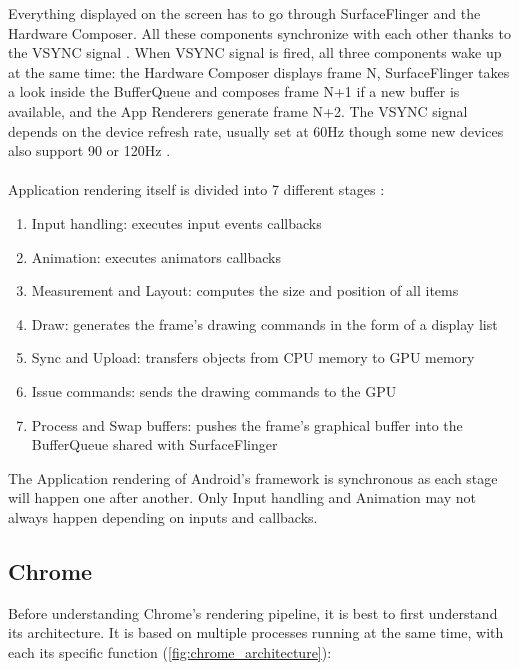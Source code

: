 \documentclass{kththesis}
\begin{document}

Everything displayed on the screen has to go through SurfaceFlinger and the Hardware Composer.
All these components synchronize with each other thanks to the VSYNC signal \cite{vsync}. When VSYNC signal is fired, all three components wake up at the same time: the Hardware Composer displays frame N, SurfaceFlinger takes a look inside the BufferQueue and composes frame N+1 if a new buffer is available, and the App Renderers generate frame N+2. The VSYNC signal depends on the device refresh rate, usually set at 60Hz though some new devices also support 90 or 120Hz \cite{refresh_rate}.

\paragraph{}
Application rendering itself is divided into 7 different stages \cite{app_rendering}:
\begin{enumerate}
    \item Input handling: executes input events callbacks
    \item Animation: executes animators callbacks
    \item Measurement and Layout: computes the size and position of all items
    \item Draw: generates the frame's drawing commands in the form of a display list
    \item Sync and Upload: transfers objects from CPU memory to GPU memory
    \item Issue commands: sends the drawing commands to the GPU
    \item Process and Swap buffers: pushes the frame's graphical buffer into the BufferQueue shared with SurfaceFlinger
\end{enumerate}

The Application rendering of Android's framework is synchronous as each stage will happen one after another. Only Input handling and Animation may not always happen depending on inputs and callbacks.

\subsection{Chrome}
Before understanding Chrome's rendering pipeline, it is best to first understand its architecture. It is based on multiple processes running at the same time, with each its specific function \cite{chrome_architecture} (\autoref{fig:chrome_architecture}):
\end{document}

